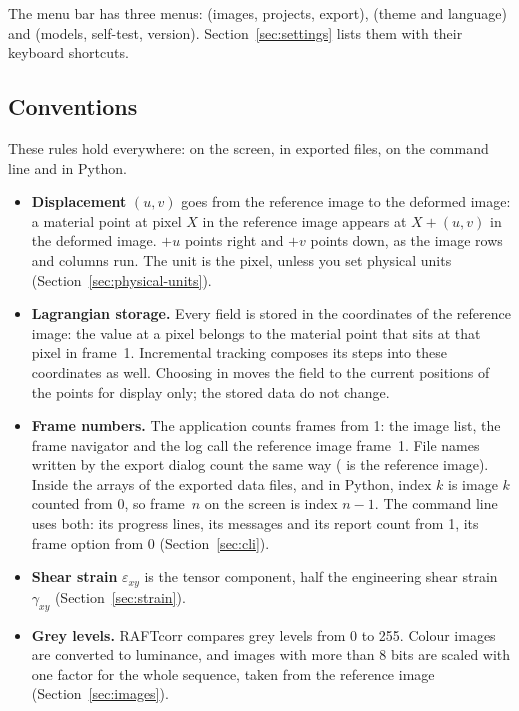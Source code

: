 The menu bar has three menus:  (images, projects, export),  (theme and
language) and  (models, self-test, version). Section~\ref{sec:settings} lists them with
their keyboard shortcuts.

\subsection{Conventions}
\label{sec:conventions}

These rules hold everywhere: on the screen, in exported files, on the command line and in
Python.

\begin{itemize}
  \item \textbf{Displacement} $(u, v)$ goes from the reference image to the deformed image: a
    material point at pixel $X$ in the reference image appears at $X + (u, v)$ in the deformed
    image. $+u$ points right and $+v$ points down, as the image rows and columns run. The unit is
    the pixel, unless you set physical units (Section~\ref{sec:physical-units}).
  \item \textbf{Lagrangian storage.} Every field is stored in the coordinates of the reference
    image: the value at a pixel belongs to the material point that sits at that pixel in frame~1.
    Incremental tracking composes its steps into these coordinates as well. Choosing
     in  moves the field to the current positions of the points for
    display only; the stored data do not change.
  \item \textbf{Frame numbers.} The application counts frames from 1: the image list, the frame
    navigator and the log call the reference image frame~1. File names written by
    the export dialog count the same way ( is the reference image). Inside the
    arrays of the exported data files, and in Python, index $k$ is image $k$ counted from 0, so
    frame~$n$ on the screen is index $n-1$. The command line uses both: its progress lines, its
    messages and its  report count from 1, its frame option  from 0
    (Section~\ref{sec:cli}).
  \item \textbf{Shear strain} $\varepsilon_{xy}$ is the tensor component, half the engineering
    shear strain $\gamma_{xy}$ (Section~\ref{sec:strain}).
  \item \textbf{Grey levels.} RAFTcorr compares grey levels from 0 to 255. Colour images are
    converted to luminance, and images with more than 8 bits are scaled with one factor for the
    whole sequence, taken from the reference image (Section~\ref{sec:images}).
\end{itemize}

